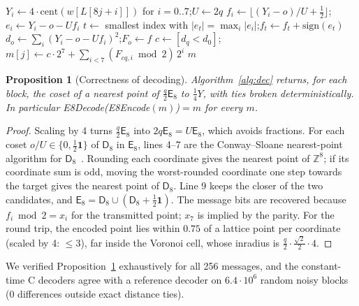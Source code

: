 \documentclass[11pt,a4paper]{article}
\newtheorem{proposition}[theorem]{Proposition}
\theoremstyle{definition}
\theoremstyle{remark}
\newcommand{\Z}{\mathbb{Z}}
\newcommand{\E}{\mathsf{E}_8}
\newcommand{\D}{\mathsf{D}_8}
\newcommand{\cent}{\mathrm{cent}}
\begin{document}
\begin{algorithm}[t]
\caption{E8Decode$(w)$, $w\in\Z_q^{256}$}\label{alg:dec}
\begin{algorithmic}[1]
  \State $Y_i\gets4\cdot\cent(w[L[8j+i]])$ for $i=0..7$;\quad $U\gets2q$
    \State $f_i\gets\lfloor (Y_i-o)/U+\tfrac12\rfloor$;\quad $e_i\gets Y_i-o-Uf_i$
      \State $t\gets$ smallest index with $|e_t|=\max_i|e_i|$;\quad $f_t\gets f_t+\mathrm{sign}(e_t)$ 
    \EndIf
    \State $d_o\gets\sum_i(Y_i-o-Uf_i)^2$;\quad $F_o\gets f$
  \EndFor
  \State $c\gets[d_q<d_0]$;\quad $m[j]\gets c\cdot2^7+\sum_{i<7}(F_{cq,i}\bmod2)\,2^i$
\EndFor
\State \Return $m$
\end{algorithmic}
\end{algorithm}

\begin{proposition}[Correctness of decoding]\label{prop:dec}
Algorithm~\ref{alg:dec} returns, for each block, the coset of a nearest point of $\tfrac q2\E$ to $\tfrac14 Y$, with ties broken deterministically. In particular E8Decode(E8Encode$(m)$)$=m$ for every $m$.
\end{proposition}
\begin{proof}
Scaling by 4 turns $\tfrac q2\E$ into $2q\E=U\E$, which avoids fractions. For each coset $o/U\in\{0,\tfrac12\mathbf 1\}$ of $\D$ in $\E$, lines 4--7 are the Conway--Sloane nearest-point algorithm for $\D$~\cite{conway}. Rounding each coordinate gives the nearest point of $\Z^8$; if its coordinate sum is odd, moving the worst-rounded coordinate one step towards the target gives the nearest point of $\D$. Line 9 keeps the closer of the two candidates, and $\E=\D\cup(\D+\frac12\mathbf 1)$. The message bits are recovered because $f_i\bmod2=x_i$ for the transmitted point; $x_7$ is implied by the parity. For the round trip, the encoded point lies within $0.75$ of a lattice point per coordinate (scaled by 4: $\le3$), far inside the Voronoi cell, whose inradius is $\tfrac q2\cdot\tfrac{\sqrt2}{2}\cdot4$.
\end{proof}

We verified Proposition~\ref{prop:dec} exhaustively for all 256 messages, and the constant-time C decoders agree with a reference decoder on $6.4\cdot10^6$ random noisy blocks (0 differences outside exact distance ties).
\end{document}
